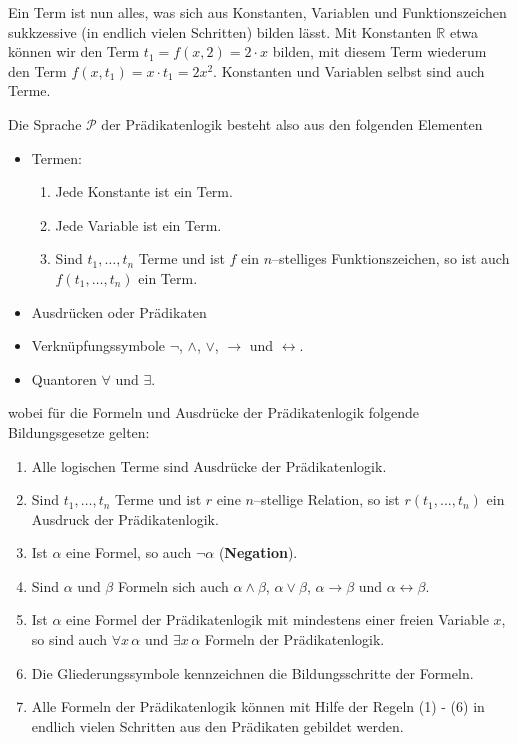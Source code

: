 Ein Term ist nun alles, was sich aus Konstanten, Variablen und Funktionszeichen sukkzessive (in endlich vielen 
Schritten) bilden lässt. Mit 
Konstanten $\mathbb R$ etwa können wir den Term $t_1 = f(x,2) = 2 \cdot x$ bilden, mit diesem Term wiederum 
den Term $f(x, t_1) = x \cdot t_1 = 2x^2$. Konstanten und Variablen selbst sind auch Terme.


Die Sprache $\mathscr{P}$ der Prädikatenlogik besteht also aus den folgenden Elementen 
\begin{itemize}
\item Termen:
\begin{enumerate}
\item Jede Konstante ist ein Term.
\item Jede Variable ist ein Term.
\item Sind $t_1, \ldots, t_n$ Terme und ist $f$ ein $n$--stelliges Funktionszeichen, so ist auch 
$f(t_1, \ldots, t_n)$ ein Term.
\end{enumerate}
\item Ausdrücken oder Prädikaten
\item Verknüpfungssymbole $\neg$, $\wedge$, $\vee$, $\rightarrow$ und $\leftrightarrow$.
\item Quantoren $\forall$ und $\exists$.
\end{itemize}
wobei für die Formeln und Ausdrücke der Prädikatenlogik folgende Bildungsgesetze gelten:
\begin{enumerate}
\item Alle logischen Terme sind Ausdrücke der Prädikatenlogik.
\item Sind $t_1, \ldots , t_n$ Terme und ist $r$ eine $n$--stellige Relation, so ist $r(t_1, \ldots, t_n)$ 
ein Ausdruck der Prädikatenlogik.
\item Ist $\alpha$ eine Formel, so auch $\neg \alpha$ (\textbf{Negation}).
\item Sind $\alpha$ und $\beta$ Formeln sich auch $\alpha \wedge \beta$, 
$\alpha \vee \beta$, $\alpha \rightarrow \beta$ und 
$\alpha \leftrightarrow \beta$.
\item Ist $\alpha$ eine Formel der Prädikatenlogik mit mindestens einer freien Variable $x$, so sind auch 
$\forall x \,\alpha$ und $\exists x \, \alpha$ Formeln der Prädikatenlogik.
\item Die Gliederungssymbole kennzeichnen die Bildungsschritte der Formeln.
\item Alle Formeln der Prädikatenlogik können mit Hilfe der Regeln (1) - (6) in endlich vielen Schritten aus 
den Prädikaten gebildet werden.
\end{enumerate} 

